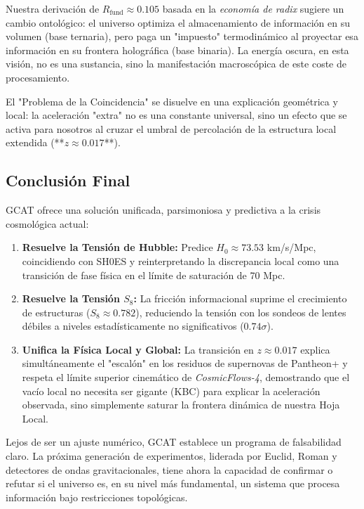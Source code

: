 \documentclass[12pt, a4paper]{article}
\theoremstyle{plain}
\theoremstyle{definition}
\begin{document}
Nuestra derivación de $R_{\text{fund}} \approx 0.105$ basada en la \textit{economía de radix} sugiere un cambio ontológico: el universo optimiza el almacenamiento de información en su volumen (base ternaria), pero paga un "impuesto" termodinámico al proyectar esa información en su frontera holográfica (base binaria). La energía oscura, en esta visión, no es una sustancia, sino la manifestación macroscópica de este coste de procesamiento.

El "Problema de la Coincidencia" se disuelve en una explicación geométrica y local: la aceleración "extra" no es una constante universal, sino un efecto que se activa para nosotros al cruzar el umbral de percolación de la estructura local extendida (**$z \approx 0.017$**).

\subsection{Conclusión Final}

GCAT ofrece una solución unificada, parsimoniosa y predictiva a la crisis cosmológica actual:
\begin{enumerate}
    \item \textbf{Resuelve la Tensión de Hubble:} Predice $H_0 \approx 73.53$ km/s/Mpc, coincidiendo con SH0ES y reinterpretando la discrepancia local como una transición de fase física en el límite de saturación de 70 Mpc.
    \item \textbf{Resuelve la Tensión $S_8$:} La fricción informacional suprime el crecimiento de estructuras ($S_8 \approx 0.782$), reduciendo la tensión con los sondeos de lentes débiles a niveles estadísticamente no significativos ($0.74\sigma$).
    \item \textbf{Unifica la Física Local y Global:} La transición en $z \approx 0.017$ explica simultáneamente el "escalón" en los residuos de supernovas de Pantheon+ y respeta el límite superior cinemático de \textit{CosmicFlows-4}, demostrando que el vacío local no necesita ser gigante (KBC) para explicar la aceleración observada, sino simplemente saturar la frontera dinámica de nuestra Hoja Local.
\end{enumerate}

Lejos de ser un ajuste numérico, GCAT establece un programa de falsabilidad claro. La próxima generación de experimentos, liderada por Euclid, Roman y detectores de ondas gravitacionales, tiene ahora la capacidad de confirmar o refutar si el universo es, en su nivel más fundamental, un sistema que procesa información bajo restricciones topológicas.
\end{document}

